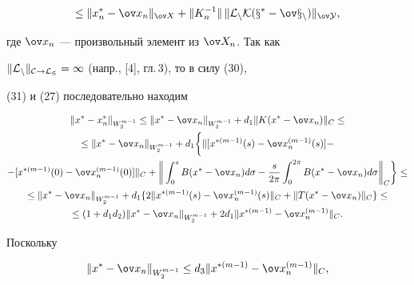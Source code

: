 \begin{pf}
\begin{multline}
\leq \| x_n^* - \ov x_n \|_{\ov X} + \| K_n^{-1} \| \,


 \| \rL_n K(x^* - \ov x_n) \|_{\ov Y},


\end{multline}


где $\ov x_n$ --- произвольный элемент из $\ov X_n$. Так как


$\|\cal{L}_n \|_{C \to L_2}=1 $ (напр., [4], гл.\,3), то в силу (30),


(31) и (27) последовательно находим


\begin{multline}


\| x^* - x_n^* \|_{W_2^{m-1}} \leq \| x^* - \ov x_n \|_{W_


2^{m-1}} + d_1 \| K(x^* - \ov x_n) \|_{C} \leq \\


%


\leq \| x^* - \ov x_n \|_{W_2^{m-1}} + d_1 \bigg\lbrace \| [x^{*(m-1)}


(s) - \ov x_n^{(m-1)}(s)] - \\


%


- [x^{*(m-1)}(0) - \ov x_n^{(m-1)}(0)] \|_{C} + \bigg\| \int_{0}^{s}


B(x^* - \ov x_n) d \sigma - \frac{s}{2 \pi} \int_{0}^{2 \pi} B(x^* - \ov


x_n) d \sigma \bigg\|_{C} \bigg\rbrace \leq \\


%


\leq \| x^* - \ov x_n \|_{W_2^{m-1}} + d_1 \lbrace 2 \| x^{*(m-1)}


(s) - \ov x_n^{(m-1)}(s) \|_{C} + \| T(x^* - \ov x_n) \|_{C}


\rbrace \leq \\


%


\leq (1 + d_1d_2) \| x^* - \ov x_n \|_{W_2^{m-1}} +2d_1 \| x^{*


(m-1)} - \ov x_n^{(m-1)} \|_{C}.


\end{multline}





Поскольку


$$


\| x^* - \ov x_n \|_{W_2^{m-1}} \leq d_3 \| x^{*(m-1)} -


\ov x_n^{(m-1)} \|_{C},


$$



\end{pf}
